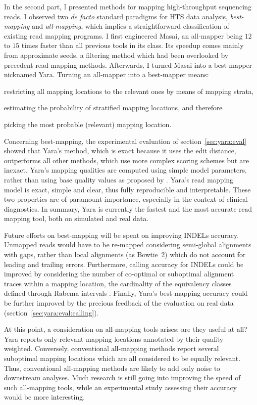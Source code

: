 In the second part, I presented methods for mapping high-throughput sequencing reads.
I observed two \emph{de facto} standard paradigms for HTS data analysis, \emph{best-mapping} and \emph{all-mapping}, which implies a straightforward classification of existing read mapping programs.
I first engineered Masai, an all-mapper being $12$ to $15$ times faster than all previous tools in its class.
Its speedup comes mainly from approximate seeds, a filtering method which had been overlooked by precedent read mapping methods.
Afterwards, I turned Masai into a best-mapper nicknamed Yara.
Turning an all-mapper into a best-mapper means:
\begin{inparaenum}[(i)]
\item restricting all mapping locations to the relevant ones by means of mapping strata,
\item estimating the probability of stratified mapping locations, and therefore 
\item picking the most probable (\ie relevant) mapping location.
\end{inparaenum}

Concerning best-mapping, the experimental evaluation of section~\ref{sec:yara:eval} showed that Yara's method, which is exact because it uses the edit distance, outperforms all other methods, which use more complex scoring schemes but are inexact.
Yara's mapping qualities are computed using simple model parameters, rather than using base quality values as proposed by \cite{Li2009}.
Yara's read mapping model is exact, simple and clear, thus fully reproducible and interpretable.
These two properties are of paramount importance, especially in the context of clinical diagnostics.
In summary, Yara is currently the fastest and the most accurate read mapping tool, both on simulated and real data.

Future efforts on best-mapping will be spent on improving INDELs accuracy.
Unmapped reads would have to be re-mapped considering semi-global alignments with gaps, rather than local alignments (\eg as Bowtie~2) which do not account for leading and trailing errors.
Furthermore, calling accuracy for INDELs could be improved by considering the number of co-optimal or suboptimal alignment traces within a mapping location, \ie the cardinality of the equivalency classes defined through Rabema intervals \citep{Holtgrewe2011}.
Finally, Yara's best-mapping accuracy could be further improved by the precious feedback of the evaluation on real data (section~\ref{sec:yara:eval:calling}).

At this point, a consideration on all-mapping tools arises: are they useful at all?
Yara reports only relevant mapping locations annotated by their quality \ie weighted.
Conversely, conventional all-mapping methods report several suboptimal mapping locations which are all considered to be equally relevant.
Thus, conventional all-mapping methods are likely to add only noise to downstream analyses.
Much research is still going into improving the speed of such all-mapping tools, while an experimental study assessing their accuracy would be more interesting.
